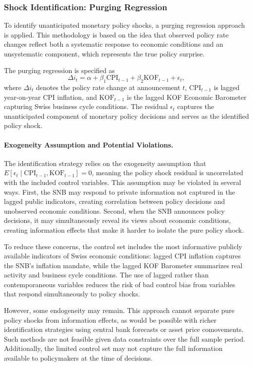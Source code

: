 \documentclass[12pt,a4paper]{article}
\begin{document}
\subsubsection{Shock Identification: Purging Regression}
To identify unanticipated monetary policy shocks, a purging regression approach is applied. This methodology is based on the idea that observed policy rate changes reflect both a systematic response to economic conditions and an unsystematic component, which represents the true policy surprise.


The purging regression is specified as
\begin{equation}
	\Delta i_t = \alpha + \beta_1 \text{CPI}_{t-1} + \beta_2 \text{KOF}_{t-1} + \epsilon_t,
	\label{eq:purging}
\end{equation}
where $\Delta i_t$ denotes the policy rate change at announcement $t$, $\text{CPI}_{t-1}$ is lagged year-on-year CPI inflation, and $\text{KOF}_{t-1}$ is the lagged KOF Economic Barometer capturing Swiss business cycle conditions. The residual $\epsilon_t$ captures the unanticipated component of monetary policy decisions and serves as the identified policy shock.

\paragraph{Exogeneity Assumption and Potential Violations.}
The identification strategy relies on the exogeneity assumption that $E[\epsilon_t \mid \text{CPI}_{t-1}, \text{KOF}_{t-1}] = 0$, meaning the policy shock residual is uncorrelated with the included control variables. This assumption may be violated in several ways. First, the SNB may respond to private information not captured in the lagged public indicators, creating correlation between policy decisions and unobserved economic conditions. Second, when the SNB announces policy decisions, it may simultaneously reveal its views about economic conditions, creating information effects that make it harder to isolate the pure policy shock.

To reduce these concerns, the control set includes the most informative publicly available indicators of Swiss economic conditions: lagged CPI inflation captures the SNB's inflation mandate, while the lagged KOF Barometer summarizes real activity and business cycle conditions. The use of lagged rather than contemporaneous variables reduces the risk of bad control bias from variables that respond simultaneously to policy shocks.

However, some endogeneity may remain. This approach cannot separate pure policy shocks from information effects, as would be possible with richer identification strategies using central bank forecasts or asset price comovements. Such methods are not feasible given data constraints over the full sample period. Additionally, the limited control set may not capture the full information available to policymakers at the time of decisions.
\end{document}
